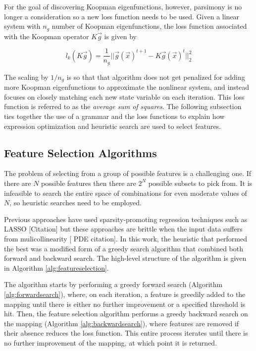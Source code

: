 \documentclass{article}
\begin{document}
For the goal of discovering Koopman eigenfunctions, however, parsimony is no longer a consideration so a new loss function needs to be used. Given a linear system with $n_g$ number of Koopman eigenfunctions, the loss function associated with the Koopman operator $K \vec{g}$ is given by

\[ l_k(K \vec{g}) = \frac{1}{n_g}||\vec{g}(\vec{x})^{t+1} - K \vec{g}(\vec{x})^{t}||_2^2 \]

The scaling by $1/n_g$ is so that that algorithm does not get penalized for adding more Koopman eigenfunctions to approximate the nonlinear system, and instead focuses on closely matching each new state variable on each iteration. This loss function is referred to as the \emph{average sum of squares}. The following subsection ties together the use of a grammar and the loss functions to explain how expression optimization and heuristic search are used to select features.


\subsection{Feature Selection Algorithms}

The problem of selecting from a group of possible features is a challenging one. If there are $N$ possible features then there are $2^N$ possible subsets to pick from. It is infeasible to search the entire space of combinations for even moderate values of $N$, so heuristic searches need to be employed. 

Previous approaches have used sparsity-promoting regression techniques such as LASSO [Citation] but these approaches are brittle when the input data suffers from mulicollinearity [ PDE citation]. In this work, the heuristic that performed the best was a modified form of a greedy search algorithm that combined both forward and backward search. The high-level structure of the algorithm is given in Algorithm \ref{alg:featureselection}.

The algorithm starts by performing a greedy forward search (Algorithm \ref{alg:forwardsearch}), where, on each iteration, a feature is greedily added to the mapping until there is either no further improvement or a specified threshold is hit. Then, the feature selection algorithm performs a greedy backward search on the mapping (Algorithm \ref{alg:backwardsearch}), where features are removed if their absence reduces the loss function. This entire process iterates until there is no further improvement of the mapping, at which point it is returned.
\end{document}
